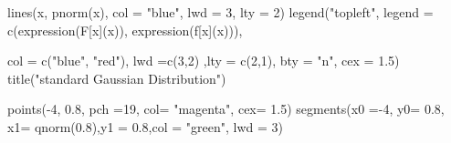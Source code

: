 \documentclass[
]{article}
\newenvironment{Shaded}{\begin{snugshade}}{\end{snugshade}}
\newcommand{\AttributeTok}[1]{\textcolor[rgb]{0.77,0.63,0.00}{#1}}
\newcommand{\DecValTok}[1]{\textcolor[rgb]{0.00,0.00,0.81}{#1}}
\newcommand{\FloatTok}[1]{\textcolor[rgb]{0.00,0.00,0.81}{#1}}
\newcommand{\FunctionTok}[1]{\textcolor[rgb]{0.00,0.00,0.00}{#1}}
\newcommand{\NormalTok}[1]{#1}
\newcommand{\SpecialCharTok}[1]{\textcolor[rgb]{0.00,0.00,0.00}{#1}}
\newcommand{\StringTok}[1]{\textcolor[rgb]{0.31,0.60,0.02}{#1}}
\begin{document}
\begin{Shaded}
\begin{Highlighting}[]
\FunctionTok{lines}\NormalTok{(x, }\FunctionTok{pnorm}\NormalTok{(x), }\AttributeTok{col =} \StringTok{"blue"}\NormalTok{, }\AttributeTok{lwd =} \DecValTok{3}\NormalTok{, }\AttributeTok{lty =} \DecValTok{2}\NormalTok{)}
\FunctionTok{legend}\NormalTok{(}\StringTok{"topleft"}\NormalTok{, }\AttributeTok{legend =} \FunctionTok{c}\NormalTok{(}\FunctionTok{expression}\NormalTok{(F[x](x)),}
                             \FunctionTok{expression}\NormalTok{(f[x](x))),}
       
        \AttributeTok{col =} \FunctionTok{c}\NormalTok{(}\StringTok{"blue"}\NormalTok{, }\StringTok{"red"}\NormalTok{), }\AttributeTok{lwd =}\FunctionTok{c}\NormalTok{(}\DecValTok{3}\NormalTok{,}\DecValTok{2}\NormalTok{)}
\NormalTok{       ,}\AttributeTok{lty =} \FunctionTok{c}\NormalTok{(}\DecValTok{2}\NormalTok{,}\DecValTok{1}\NormalTok{), }\AttributeTok{bty =} \StringTok{"n"}\NormalTok{, }\AttributeTok{cex =} \FloatTok{1.5}\NormalTok{)}
\FunctionTok{title}\NormalTok{(}\StringTok{"standard Gaussian Distribution"}\NormalTok{)}

\FunctionTok{points}\NormalTok{(}\SpecialCharTok{{-}}\DecValTok{4}\NormalTok{, }\FloatTok{0.8}\NormalTok{, }\AttributeTok{pch =}\DecValTok{19}\NormalTok{, }\AttributeTok{col=} \StringTok{"magenta"}\NormalTok{,}
       \AttributeTok{cex=} \FloatTok{1.5}\NormalTok{)}
\FunctionTok{segments}\NormalTok{(}\AttributeTok{x0 =}\SpecialCharTok{{-}}\DecValTok{4}\NormalTok{, }\AttributeTok{y0=} \FloatTok{0.8}\NormalTok{, }\AttributeTok{x1=} \FunctionTok{qnorm}\NormalTok{(}\FloatTok{0.8}\NormalTok{),}\AttributeTok{y1 =} \FloatTok{0.8}\NormalTok{,}\AttributeTok{col =} \StringTok{"green"}\NormalTok{, }\AttributeTok{lwd =} \DecValTok{3}\NormalTok{)}


\end{Highlighting}
\end{Shaded}
\end{document}
